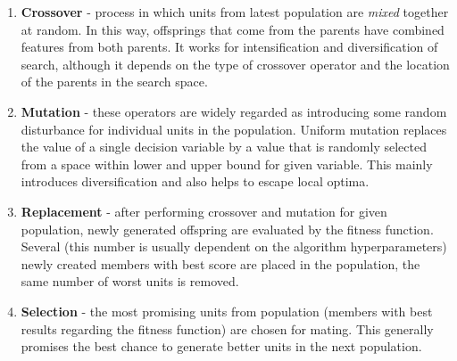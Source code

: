 \documentclass[11pt,a4paper,openany]{book}
\begin{document}





\begin{enumerate}
\item \textbf{Crossover} - process in which units from latest population are \textit{mixed} together at random. In this way, offsprings that come from the parents have combined features from both parents. It works for intensification and diversification of search, although it depends on the type of crossover operator and the location of the parents in the search space.
\item \textbf{Mutation} - these operators are widely regarded as introducing some random disturbance for individual units in the population. Uniform mutation replaces the value of a single decision variable by a value that is randomly selected from a space within lower and upper bound for given variable. This mainly introduces diversification and also helps to escape local optima.
\item \textbf{Replacement} - after performing crossover and mutation for given population, newly generated offspring are evaluated by the fitness function. Several (this number is usually dependent on the algorithm hyperparameters) newly created members with best score are placed in the population, the same number of worst units is removed.
\item \textbf{Selection} - the most promising units from population (members with best results regarding the fitness function) are chosen for mating. This generally promises the best chance to generate better units in the next population.
\end{enumerate}
\end{document}
